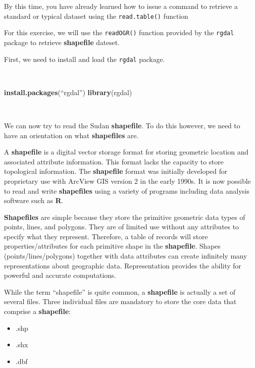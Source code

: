 \documentclass[12pt,a4paper,a4paper]{book}
\newenvironment{Shaded}{\begin{snugshade}}{\end{snugshade}}
\newcommand{\KeywordTok}[1]{\textcolor[rgb]{0.13,0.29,0.53}{\textbf{#1}}}
\newcommand{\NormalTok}[1]{#1}
\providecommand{\tightlist}{%
  \setlength{\itemsep}{0pt}\setlength{\parskip}{0pt}}
\theoremstyle{definition}
\theoremstyle{definition}
\theoremstyle{definition}
\theoremstyle{remark}
\begin{document}
By this time, you have already learned how to issue a command to
retrieve a standard or typical dataset using the \texttt{read.table()}
function

For this exercise, we will use the \texttt{readOGR()} function provided
by the \texttt{rgdal} package to retrieve \textbf{shapefile} dateset.

First, we need to install and load the \texttt{rgdal} package.

~

\begin{Shaded}
\begin{Highlighting}[]
\KeywordTok{install.packages}\NormalTok{(“rgdal”)}
\KeywordTok{library}\NormalTok{(rgdal)}
\end{Highlighting}
\end{Shaded}

~

We can now try to read the Sudan \textbf{shapefile}. To do this however,
we need to have an orientation on what \textbf{shapefiles} are.

A \textbf{shapefile} is a digital vector storage format for storing
geometric location and associated attribute information. This format
lacks the capacity to store topological information. The
\textbf{shapefile} format was initially developed for proprietary use
with ArcView GIS version 2 in the early 1990s. It is now possible to
read and write \textbf{shapefiles} using a variety of programs including
data analysis software such as \textbf{R}.

\textbf{Shapefiles} are simple because they store the primitive
geometric data types of points, lines, and polygons. They are of limited
use without any attributes to specify what they represent. Therefore, a
table of records will store properties/attributes for each primitive
shape in the \textbf{shapefile}. Shapes (points/lines/polygons) together
with data attributes can create infinitely many representations about
geographic data. Representation provides the ability for powerful and
accurate computations.

While the term ``shapefile'' is quite common, a \textbf{shapefile} is
actually a set of several files. Three individual files are mandatory to
store the core data that comprise a \textbf{shapefile}:

\begin{itemize}
\tightlist
\item
  .shp
\item
  .shx
\item
  .dbf
\end{itemize}
\end{document}
